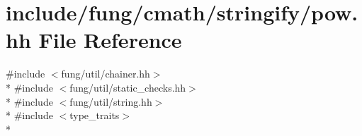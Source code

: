 \hypertarget{stringify_2pow_8hh}{\section{include/fung/cmath/stringify/pow.hh File Reference}
\label{stringify_2pow_8hh}
}
{\ttfamily \#include $<$fung/util/chainer.\-hh$>$}\\*
{\ttfamily \#include $<$fung/util/static\-\_\-checks.\-hh$>$}\\*
{\ttfamily \#include $<$fung/util/string.\-hh$>$}\\*
{\ttfamily \#include $<$type\-\_\-traits$>$}\\*
